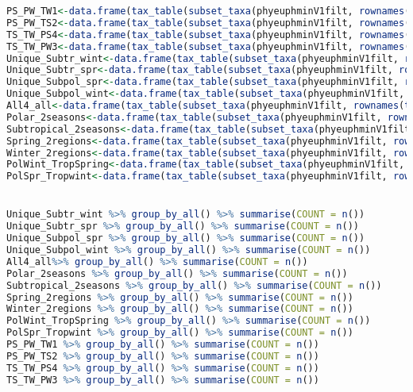 \documentclass{article}
\begin{document}
\begin{lstlisting}[language=R,caption={N1N2figscripts}]
PS_PW_TW1<-data.frame(tax_table(subset_taxa(phyeuphminV1filt, rownames(tax_table(physeq)) %in% Tres1))[,1:3]) #foreachone 
PS_PW_TS2<-data.frame(tax_table(subset_taxa(phyeuphminV1filt, rownames(tax_table(physeq)) %in% Tres2))[,1:3])
TS_TW_PS4<-data.frame(tax_table(subset_taxa(phyeuphminV1filt, rownames(tax_table(physeq)) %in% Tres4))[,1:3])
TS_TW_PW3<-data.frame(tax_table(subset_taxa(phyeuphminV1filt, rownames(tax_table(physeq)) %in% Tres3))[,1:3])
Unique_Subtr_wint<-data.frame(tax_table(subset_taxa(phyeuphminV1filt, rownames(tax_table(physeq)) %in% Uniqsubtrwint))[,1:3])
Unique_Subtr_spr<-data.frame(tax_table(subset_taxa(phyeuphminV1filt, rownames(tax_table(physeq)) %in% Uniqsubtrspr))[,1:3])
Unique_Subpol_spr<-data.frame(tax_table(subset_taxa(phyeuphminV1filt, rownames(tax_table(physeq)) %in% Uniqsubpspr))[,1:3])
Unique_Subpol_wint<-data.frame(tax_table(subset_taxa(phyeuphminV1filt, rownames(tax_table(physeq)) %in% uniqsubpwint))[,1:3])
All4_all<-data.frame(tax_table(subset_taxa(phyeuphminV1filt, rownames(tax_table(physeq)) %in% All4))[,1:3])
Polar_2seasons<-data.frame(tax_table(subset_taxa(phyeuphminV1filt, rownames(tax_table(physeq)) %in% polar2))[,1:3])
Subtropical_2seasons<-data.frame(tax_table(subset_taxa(phyeuphminV1filt, rownames(tax_table(physeq)) %in% Trop2))[,1:3])
Spring_2regions<-data.frame(tax_table(subset_taxa(phyeuphminV1filt, rownames(tax_table(physeq)) %in% Spr2))[,1:3])
Winter_2regions<-data.frame(tax_table(subset_taxa(phyeuphminV1filt, rownames(tax_table(physeq)) %in% wint2))[,1:3])
PolWint_TropSpring<-data.frame(tax_table(subset_taxa(phyeuphminV1filt, rownames(tax_table(physeq)) %in% cruz1))[,1:3])
PolSpr_Tropwint<-data.frame(tax_table(subset_taxa(phyeuphminV1filt, rownames(tax_table(physeq)) %in% cruz2))[,1:3])


Unique_Subtr_wint %>% group_by_all() %>% summarise(COUNT = n())
Unique_Subtr_spr %>% group_by_all() %>% summarise(COUNT = n())
Unique_Subpol_spr %>% group_by_all() %>% summarise(COUNT = n())
Unique_Subpol_wint %>% group_by_all() %>% summarise(COUNT = n())
All4_all%>% group_by_all() %>% summarise(COUNT = n())
Polar_2seasons %>% group_by_all() %>% summarise(COUNT = n())
Subtropical_2seasons %>% group_by_all() %>% summarise(COUNT = n())
Spring_2regions %>% group_by_all() %>% summarise(COUNT = n())
Winter_2regions %>% group_by_all() %>% summarise(COUNT = n())
PolWint_TropSpring %>% group_by_all() %>% summarise(COUNT = n())
PolSpr_Tropwint %>% group_by_all() %>% summarise(COUNT = n())
PS_PW_TW1 %>% group_by_all() %>% summarise(COUNT = n())
PS_PW_TS2 %>% group_by_all() %>% summarise(COUNT = n())
TS_TW_PS4 %>% group_by_all() %>% summarise(COUNT = n())
TS_TW_PW3 %>% group_by_all() %>% summarise(COUNT = n())


\end{lstlisting}
\end{document}
